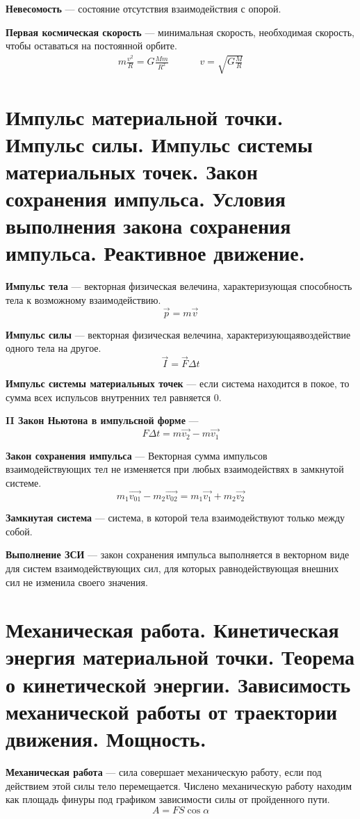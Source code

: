 \documentclass{report}
\begin{document}
{\bf Невесомость} ---
состояние отсутствия взаимодействия с опорой.

{\bf Первая космическая скорость} ---
минимальная скорость, необходимая скорость, чтобы оставаться на постоянной орбите.
$$
  \begin{array}{ccccc}
    m\frac{v^2}{R}=G\frac{Mm}{R^2} &&&& v=\sqrt{G\frac{M}{R}}
  \end{array}
$$



\part{Импульс материальной точки. 
Импульс силы. 
Импульс системы материальных точек. 
Закон сохранения импульса. 
Условия выполнения закона сохранения импульса. 
Реактивное движение.}

{\bf Импульс тела} ---
векторная физическая велечина, характеризующая способность тела к возможному взаимодействию.
$$
\vec{p}=m\vec{v}
$$

{\bf Импульс силы} ---
векторная физическая велечина, характеризующаявоздействие одного тела на другое.
$$
\vec{I}=\vec{F}\Delta t
$$

{\bf Импульс системы материальных точек} ---
если система находится в покое, то сумма всех испульсов внутренних тел равняется $0$.

{\bf II Закон Ньютона в импульсной форме} ---
$$
F\Delta t=m\vec{v_2}-m\vec{v_1}
$$

{\bf Закон сохранения импульса} ---
Векторная сумма импульсов взаимодействующих тел не изменяется при любых взаимодействях в
замкнутой системе.
$$
m_1\overrightarrow{v_{01}}-m_2\overrightarrow{v_{02}}=
m_1\overrightarrow{v_1}+m_2\overrightarrow{v_2}
$$

{\bf Замкнутая система} ---
система, в которой тела взаимодействуют только между собой.

{\bf Выполнение ЗСИ} ---
закон сохранения импульса выполняется в векторном виде для систем взаимодействующих
сил, для которых равнодействующая внешних сил не изменила своего значения.



\part{Механическая работа. 
Кинетическая энергия материальной точки. 
Теорема о кинетической энергии. 
Зависимость механической работы от траектории движения. 
Мощность.}

{\bf Механическая работа} ---
сила совершает механическую работу, если под действием этой силы тело перемещается.
Числено механическую работу находим как площадь финуры под графиком зависимости силы от 
пройденного пути.
$$
A=FS\cos{\alpha}
$$
\end{document}
